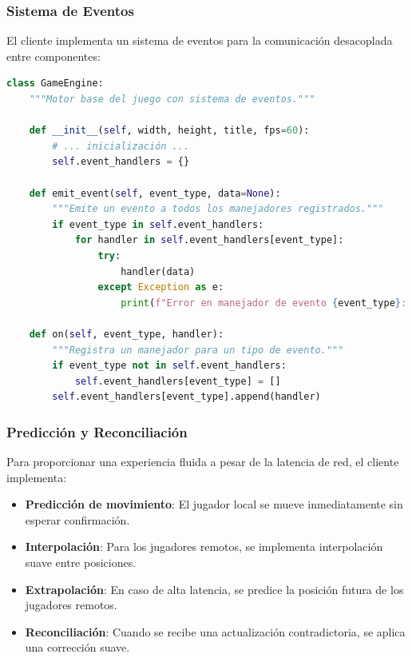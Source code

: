 \documentclass[11pt,letterpaper]{article}
\begin{document}
\subsubsection{Sistema de Eventos}

El cliente implementa un sistema de eventos para la comunicación desacoplada entre componentes:

\begin{lstlisting}[language=python, caption=Implementación del sistema de eventos]
class GameEngine:
    """Motor base del juego con sistema de eventos."""
    
    def __init__(self, width, height, title, fps=60):
        # ... inicialización ...
        self.event_handlers = {}
    
    def emit_event(self, event_type, data=None):
        """Emite un evento a todos los manejadores registrados."""
        if event_type in self.event_handlers:
            for handler in self.event_handlers[event_type]:
                try:
                    handler(data)
                except Exception as e:
                    print(f"Error en manejador de evento {event_type}: {e}")
    
    def on(self, event_type, handler):
        """Registra un manejador para un tipo de evento."""
        if event_type not in self.event_handlers:
            self.event_handlers[event_type] = []
        self.event_handlers[event_type].append(handler)
\end{lstlisting}

\subsubsection{Predicción y Reconciliación}

Para proporcionar una experiencia fluida a pesar de la latencia de red, el cliente implementa:

\begin{itemize}
    \item \textbf{Predicción de movimiento}: El jugador local se mueve inmediatamente sin esperar confirmación.
    
    \item \textbf{Interpolación}: Para los jugadores remotos, se implementa interpolación suave entre posiciones.
    
    \item \textbf{Extrapolación}: En caso de alta latencia, se predice la posición futura de los jugadores remotos.
    
    \item \textbf{Reconciliación}: Cuando se recibe una actualización contradictoria, se aplica una corrección suave.
\end{itemize}
\end{document}
